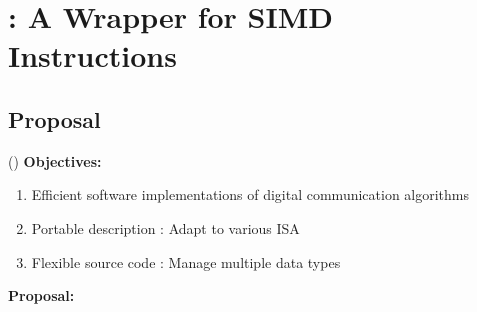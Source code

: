
\section[MIPP]{\MIPP: A \Cxx Wrapper for SIMD Instructions}

\subsection[Proposal]{Proposal}

\begin{frame}{\longMIPP (\MIPP)}
  \vfill
  \textbf{Objectives:}

  \vspace{0.1cm}
  \begin{enumerate}
    \item Efficient software implementations of digital communication algorithms
    \item Portable description : Adapt to various ISA
    \item Flexible source code : Manage multiple data types
  \end{enumerate}
  \vspace{0.3cm}
  \pause
  \textbf{Proposal:}


\end{frame}
